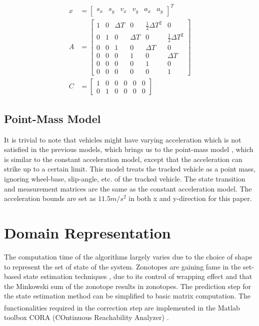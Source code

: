 \begin{equation}
\label{formula:camodel}
\begin{split}
x&= \left[\begin{matrix}
s_x & s_y & v_x & v_y & a_x & a_y
\end{matrix}\right]^{T}\\
A&= \left[\begin{matrix}
1 & 0 & \Delta T & 0 & \frac{1}{2}\Delta T^2 & 0\\
0 & 1 & 0 & \Delta T & 0 & \frac{1}{2}\Delta T^2 \\
0 & 0 & 1 & 0 & \Delta T & 0\\
0 & 0 & 0 & 1 & 0 & \Delta T\\
0 & 0 & 0 & 0 & 1 & 0\\
0 & 0 & 0 & 0 & 0 & 1
\end{matrix}\right] \\
C&= \left[\begin{matrix}
1 & 0 & 0 & 0 & 0 & 0\\
0 & 1 & 0 & 0 & 0 & 0
\end{matrix}\right]
\end{split}
\end{equation}

\subsection{Point-Mass Model}
It is trivial to note that vehicles might have varying acceleration which is not satisfied in the previous models, which brings us to the point-mass model \cite{Althoff}, which is similar to the constant acceleration model, except that the acceleration can strike up to a certain limit. This model treats the tracked vehicle as a point mass, ignoring wheel-base, slip-angle, etc. of the tracked vehicle. The state transition and measurement matrices are the same as the constant acceleration model. The acceleration bounds are set as $11.5 m/s^2$ in both x and y-direction for this paper.

\section{Domain Representation}
The computation time of the algorithms largely varies due to the choice of shape to represent the set of state of the system. Zonotopes are gaining fame in the set-based state estimation techniques \cite{Le2013}, due to its control of wrapping effect and that the Minkowski sum of the zonotope results in zonotopes. The prediction step for the state estimation method can be simplified to basic matrix computation. The functionalities required in the correction step are implemented in the Matlab\textsuperscript{\tiny\textregistered} toolbox CORA (COntinuous Reachability Analyzer) \cite{Althoff2018}.

